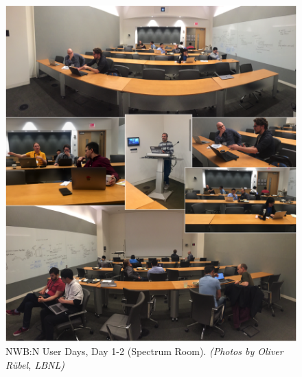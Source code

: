 \documentclass{article}
\begin{document}
\clearpage
\begin{figure}[h!]
\includegraphics[width=\textwidth]{figures/photos_day1_2_breakout_room.png}
\caption{NWB:N User Days, Day 1-2 (Spectrum Room). \textit{(Photos by Oliver R\"ubel, LBNL)}}
\end{figure}
\end{document}
